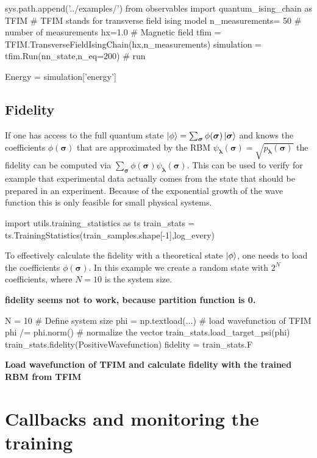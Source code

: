 \documentclass[submission, Phys]{SciPost}
\begin{document}
\begin{python}
sys.path.append('../examples/')
from observables import quantum_ising_chain as TFIM
# TFIM stands for transverse field ising model
n_measurements= 50 # number of measurements
hx=1.0             # Magnetic field
tfim = TFIM.TransverseFieldIsingChain(hx,n_measurements)
simulation = tfim.Run(nn_state,n_eq=200) # run 

Energy = simulation['energy']
\end{python}

\subsection{Fidelity}

If one has access to the full quantum state $\ket{\phi} = \sum_{\bm{\sigma}} \phi(\bm{\sigma}) \ket{ \bm{\sigma}}$ and knows the coefficients $\phi(\bm{\sigma})$ that are approximated by the RBM $\psi_{\bm{\lambda}}(\bm{\sigma}) = \sqrt{p_{\bm{\lambda}}(\bm{\sigma})}$ the fidelity can be computed via $\sum_{\bm{\sigma}} \phi(\bm{\sigma}) \psi_{\bm{\lambda}}(\bm{\sigma})$. This can be used to verify for example that experimental data actually comes from the state that should be prepared in an experiment. Because of the exponential growth of the wave function this is only feasible for small physical systems.

\begin{python}
import utils.training_statistics as ts
train_stats = ts.TrainingStatistics(train_samples.shape[-1],log_every)
\end{python}

To effectively calculate the fidelity with a theoretical state $\ket{\phi}$, one needs to load the coefficients $\phi(\bm{\sigma})$. In this example we create a random state with $2^N$ coefficients, where $N=10$ is the system size.

\textbf{fidelity seems not to work, because partition function is 0.}

\begin{python}
N = 10 # Define system size
phi =  np.textload(...) # load wavefunction of TFIM
phi /= phi.norm() # normalize the vector
train_stats.load_target_psi(phi)
train_stats.fidelity(PositiveWavefunction)
fidelity = train_stats.F
\end{python}

\textbf{Load wavefunction of TFIM and calculate fidelity with the trained RBM from TFIM}

\section{Callbacks and monitoring the training}
\end{document}
